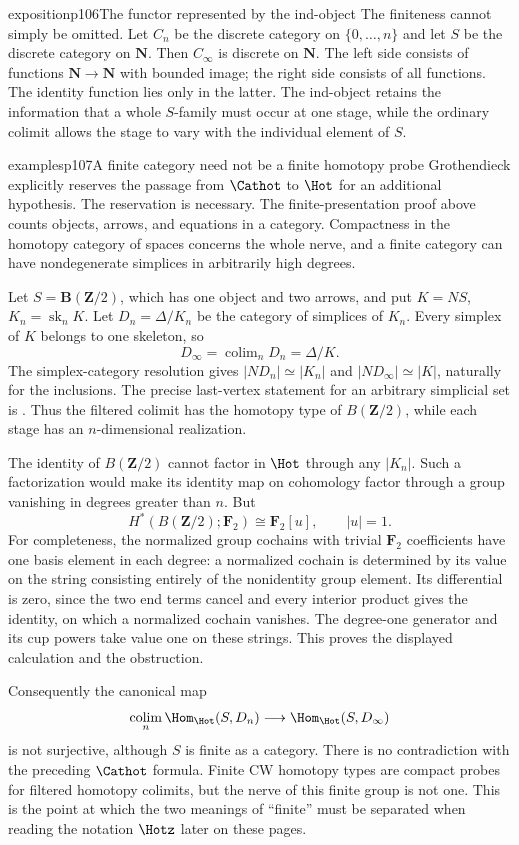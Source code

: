 \begin{dcomment}{exposition}{p106}{The functor represented by the ind-object}
The finiteness cannot simply be omitted. Let $C_n$ be the discrete category on $\{0,\ldots,n\}$ and let $S$ be the discrete category on $\mathbf N$. Then $C_\infty$ is discrete on $\mathbf N$. The left side consists of functions $\mathbf N\to\mathbf N$ with bounded image; the right side consists of all functions. The identity function lies only in the latter. The ind-object retains the information that a whole $S$-family must occur at one stage, while the ordinary colimit allows the stage to vary with the individual element of $S$.
\end{dcomment}

\begin{dcomment}{examples}{p107}{A finite category need not be a finite homotopy probe}
Grothendieck explicitly reserves the passage from $\Cathot$ to $\Hot$ for an additional hypothesis. The reservation is necessary. The finite-presentation proof above counts objects, arrows, and equations in a category. Compactness in the homotopy category of spaces concerns the whole nerve, and a finite category can have nondegenerate simplices in arbitrarily high degrees.

Let $S=\mathbf B(\mathbf Z/2)$, which has one object and two arrows, and put $K=NS$, $K_n=\operatorname{sk}_n K$. Let $D_n=\Delta/K_n$ be the category of simplices of $K_n$. Every simplex of $K$ belongs to one skeleton, so
\[
 D_\infty=\mathop{\mathrm{colim}}_nD_n=\Delta/K.
\]
The simplex-category resolution gives $|ND_n|\simeq|K_n|$ and $|ND_\infty|\simeq|K|$, naturally for the inclusions. The precise last-vertex statement for an arbitrary simplicial set is \citet[Corollary~11.9.11.5]{Kerodon2026Simplex}. Thus the filtered colimit has the homotopy type of $B(\mathbf Z/2)$, while each stage has an $n$-dimensional realization.

The identity of $B(\mathbf Z/2)$ cannot factor in $\Hot$ through any $|K_n|$. Such a factorization would make its identity map on cohomology factor through a group vanishing in degrees greater than $n$. But
\[
 H^*(B(\mathbf Z/2);\mathbf F_2)\cong\mathbf F_2[u],\qquad |u|=1.
\]
For completeness, the normalized group cochains with trivial $\mathbf F_2$ coefficients have one basis element in each degree: a normalized cochain is determined by its value on the string consisting entirely of the nonidentity group element. Its differential is zero, since the two end terms cancel and every interior product gives the identity, on which a normalized cochain vanishes. The degree-one generator and its cup powers take value one on these strings. This proves the displayed calculation and the obstruction.

Consequently the canonical map
\[
 \mathop{\mathrm{colim}}_n\Hom_{\Hot}(S,D_n)
 \longrightarrow\Hom_{\Hot}(S,D_\infty)
\]
is not surjective, although $S$ is finite as a category. There is no contradiction with the preceding $\Cathot$ formula. Finite CW homotopy types are compact probes for filtered homotopy colimits, but the nerve of this finite group is not one. This is the point at which the two meanings of ``finite'' must be separated when reading the notation $\Hotz$ later on these pages.
\end{dcomment}

